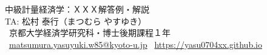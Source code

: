 \documentclass[a4paper,12pt]{ltjsarticle}
\begin{document}
\noindent
{\huge{\textsf{中級計量経済学：ＸＸＸ解答例・解説}}} {\large{
\medskip
\\
{TA: 松村 泰行}}}（まつむら やすゆき）\\
\,{\faGraduationCap} {京都大学経済学研究科・博士後期課程１年} \\
\, \href{mailto:matsumura.yasuyuki.w85@kyoto-u.jp}{\textsf{matsumura.yasuyuki.w85@kyoto-u.jp}}
\, \href{https://yasu0704xx.github.io}{\textsf{https://yasu0704xx.github.io}}  \\
\hrulefill
\section{}


\end{document}
